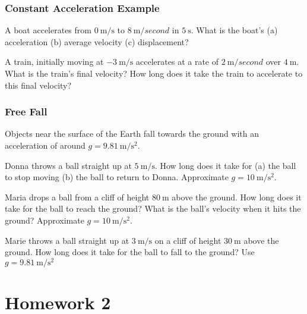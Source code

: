 \documentclass[20pt]{beamer}
\begin{document}
\begin{frame}
	\frametitle{Constant Acceleration Example}
	\begin{example}
		A boat accelerates from $\SI{0}{\meter/\second}$ to $\SI{8}{\meter/second}$ in $\SI{5}{\second}$. What is the boat's (a) acceleration (b) average velocity (c) displacement?
	\end{example}

	\begin{example}
		A train, initially moving at $\SI{-3}{\meter/\second}$ accelerates at a rate of $\SI{2}{\meter/second}$ over $\SI{4}{\meter}$. What is the train's final velocity? How long does it take the train to accelerate to this final velocity?
	\end{example}
\end{frame}

\begin{frame}
	\frametitle{Free Fall}
	Objects near the surface of the Earth fall towards the ground with an acceleration of around $g = \SI{9.81}{\meter/\second^2}$.
	\begin{example}
		Donna throws a ball straight up at $\SI{5}{\meter/\second}$. How long does it take for (a) the ball to stop moving (b) the ball to return to Donna. Approximate $g = \SI{10}{\meter/\second^2}$.
	\end{example}

	\begin{example}
		Maria drops a ball from a cliff of height $\SI{80}{\meter}$ above the ground. How long does it take for the ball to reach the ground? What is the ball's velocity when it hits the ground? Approximate $g = \SI{10}{\meter/\second^2}$.
	\end{example}

	\begin{example}
		Marie throws a ball straight up at $\SI{3}{\meter/\second}$ on a cliff of height $\SI{30}{\meter}$ above the ground. How long does it take for the ball to fall to the ground? Use $g = \SI{9.81}{\meter/\second^2}$
	\end{example}
\end{frame}

\section{Homework 2}
\end{document}
